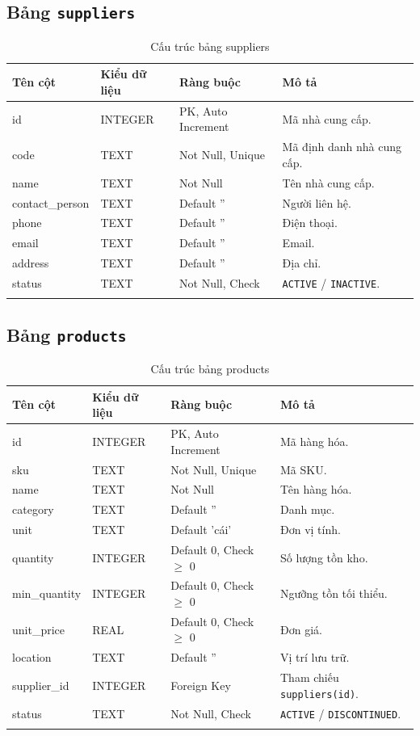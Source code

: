\documentclass[12pt,a4paper]{report}
\begin{document}
\subsection{Bảng \texttt{suppliers}}
\begin{longtable}{|L{3cm}|L{3cm}|L{3.4cm}|L{4.4cm}|}
\hline
\textbf{Tên cột} & \textbf{Kiểu dữ liệu} & \textbf{Ràng buộc} & \textbf{Mô tả} \\ \hline
\endhead
id & INTEGER & PK, Auto Increment & Mã nhà cung cấp. \\ \hline
code & TEXT & Not Null, Unique & Mã định danh nhà cung cấp. \\ \hline
name & TEXT & Not Null & Tên nhà cung cấp. \\ \hline
contact\_person & TEXT & Default '' & Người liên hệ. \\ \hline
phone & TEXT & Default '' & Điện thoại. \\ \hline
email & TEXT & Default '' & Email. \\ \hline
address & TEXT & Default '' & Địa chỉ. \\ \hline
status & TEXT & Not Null, Check & \texttt{ACTIVE} / \texttt{INACTIVE}. \\ \hline
\caption{Cấu trúc bảng suppliers}
\end{longtable}

\subsection{Bảng \texttt{products}}
\begin{longtable}{|L{3cm}|L{2.8cm}|L{3.6cm}|L{4cm}|}
\hline
\textbf{Tên cột} & \textbf{Kiểu dữ liệu} & \textbf{Ràng buộc} & \textbf{Mô tả} \\ \hline
\endhead
id & INTEGER & PK, Auto Increment & Mã hàng hóa. \\ \hline
sku & TEXT & Not Null, Unique & Mã SKU. \\ \hline
name & TEXT & Not Null & Tên hàng hóa. \\ \hline
category & TEXT & Default '' & Danh mục. \\ \hline
unit & TEXT & Default 'cái' & Đơn vị tính. \\ \hline
quantity & INTEGER & Default 0, Check $\geq$ 0 & Số lượng tồn kho. \\ \hline
min\_quantity & INTEGER & Default 0, Check $\geq$ 0 & Ngưỡng tồn tối thiểu. \\ \hline
unit\_price & REAL & Default 0, Check $\geq$ 0 & Đơn giá. \\ \hline
location & TEXT & Default '' & Vị trí lưu trữ. \\ \hline
supplier\_id & INTEGER & Foreign Key & Tham chiếu \texttt{suppliers(id)}. \\ \hline
status & TEXT & Not Null, Check & \texttt{ACTIVE} / \texttt{DISCONTINUED}. \\ \hline
\caption{Cấu trúc bảng products}
\end{longtable}
\end{document}
